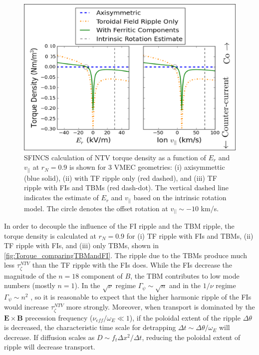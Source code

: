 \documentclass{article}
\begin{document}
\FloatBarrier

\begin{figure}[h!]
\centering
\includegraphics[width=1\textwidth]{Torque_ErandV.png}
\caption{\label{fig:Torque_ErandV} SFINCS calculation of NTV torque density as a function of $E_r$ and $v_{||}$ at $r_N = 0.9$ is shown for 3 VMEC geometries: (i) axisymmettic (blue solid), (ii) with TF ripple only (red dashed), and (iii) TF ripple with FIs and TBMs (red dash-dot). The vertical dashed line indicates the estimate of $E_r$ and $v_{||}$ based on the intrinsic rotation model. The circle denotes the offset rotation at $v_{||} \sim -10$ km/s.}
\end{figure}

In order to decouple the influence of the FI ripple and the TBM ripple, the torque density is calculated at $r_N = 0.9$ for (i) TF ripple with FIs and TBMs, (ii) TF ripple with FIs, and (iii) only TBMs, shown in \ref{fig:Torque_comparingTBMandFI}. The ripple due to the TBMs produce much less $\tau_{\zeta}^{NTV}$ than the TF ripple with the FIs does.  While the FIs decrease the magnitude of the $n = 18$ component of $B$, the TBM contributes to low mode numbers (mostly $n = 1$). In the $\sqrt{\nu}$ regime $\Gamma_{\psi} \sim \sqrt{n}$ and in the $1/\nu$ regime $\Gamma_{\psi} \sim n^2$ \cite{Shaing2010}, so it is reasonable to expect that the higher harmonic ripple of the FIs would increase $\tau_{\zeta}^{NTV}$ more strongly. Moreover, when transport is dominated by the $\bm{E} \times \bm{B}$ precession frequency ($\nu_{eff}/\omega_E \ll 1$), if the poloidal extent of the ripple $\Delta \theta$ is decreased, the characteristic time scale for detrapping $\Delta t \sim \Delta \theta/ \omega_E$ will decrease. If diffusion scales as $D \sim f_t \Delta x^2/\Delta t$, reducing the poloidal extent of ripple will decrease transport. 
\end{document}
